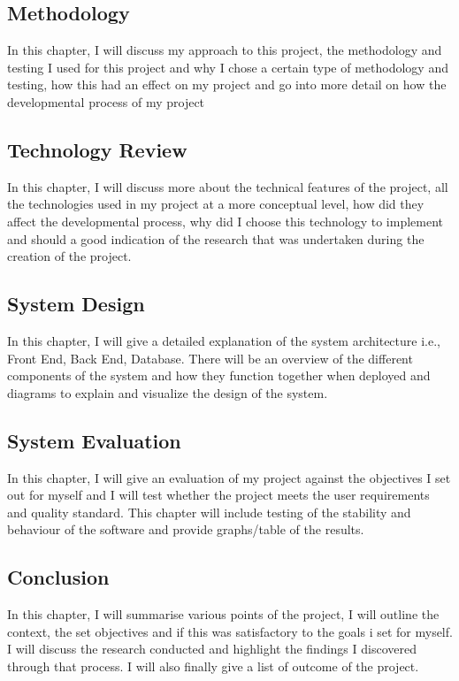 \subsection{Methodology}

In this chapter, I will discuss my approach to this project, the methodology and testing I used for this project and why I chose a certain type of methodology and testing, how this had an effect on my project and go into more detail on how the developmental process of my project

\subsection{Technology Review}

In this chapter, I will discuss more about the technical features of the project, all the technologies used in my project at a more conceptual level, how did they affect the developmental process, why did I choose this technology to implement and should a good indication of the research that was undertaken during the creation of the project.

\subsection{System Design}

In this chapter, I will give a detailed explanation of the system architecture i.e., Front End, Back End, Database. There will be an overview of the different components of the system and how they function together when deployed and diagrams to explain and visualize the design of the system.

\subsection{System Evaluation}

In this chapter, I will give an evaluation of my project against the objectives I set out for myself and I will test whether the project meets the user requirements and quality standard. This chapter will include testing of the stability and behaviour of the software and provide graphs/table of the results.

\subsection{Conclusion}

In this chapter, I will summarise various points of the project, I will outline the context, the set objectives and if this was satisfactory to the goals i set for myself. I will discuss the research conducted and highlight the findings I discovered through that process. I will also finally give a list of outcome of the project.

